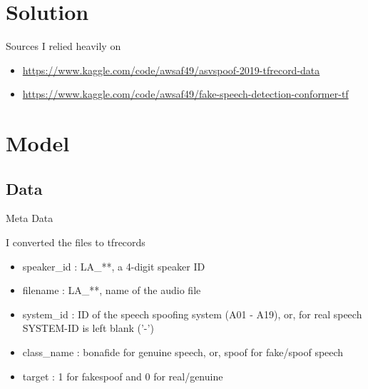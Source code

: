 \documentclass[hyperref={pdfpagelabels=false}, color=table]{beamer}
\begin{document}
\section{Solution}

    \begin{frame}{Sources}
        I relied heavily on
        \begin{itemize}
            \item \href{https://www.kaggle.com/code/awsaf49/asvspoof-2019-tfrecord-data}{https://www.kaggle.com/code/awsaf49/asvspoof-2019-tfrecord-data}
            \item \href{https://www.kaggle.com/code/awsaf49/fake-speech-detection-conformer-tf}{https://www.kaggle.com/code/awsaf49/fake-speech-detection-conformer-tf}
        \end{itemize}
    \end{frame}

    \section{Model}
    \subsection{Data}
    \begin{frame}{Meta Data}
\small

I converted the files to tfrecords

        \begin{itemize}
            \item speaker\_id : LA\_**, a 4-digit speaker ID
            \item filename : LA\_**, name of the audio file
            \item system\_id : ID of the speech spoofing system (A01 - A19), or, for real speech SYSTEM-ID is left blank ('-')
            \item class\_name : bonafide for genuine speech, or, spoof for fake/spoof speech
            \item target : 1 for fake\/spoof and 0 for real/genuine
        \end{itemize}
    \end{frame}
\end{document}
